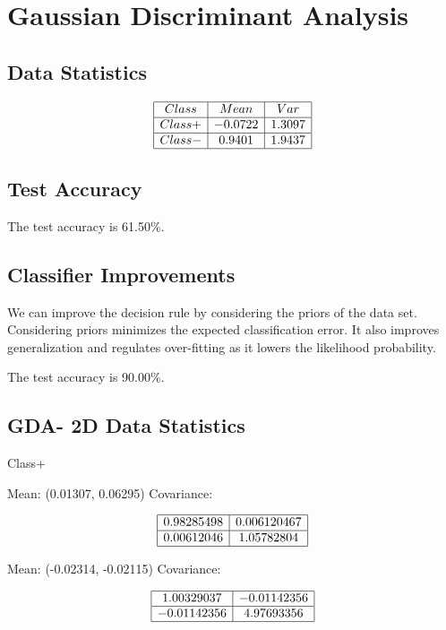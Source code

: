 \documentclass{article}
\begin{document}
\section{Gaussian Discriminant Analysis}
\subsection{Data Statistics}

\[
\begin{array}{|c|c|c|}
\hline
Class & Mean & Var \\
\hline
Class + & -0.0722 & 1.3097 \\
\hline
Class - & 0.9401 & 1.9437 \\
\hline
\end{array}
\]

\subsection{Test Accuracy}
The test accuracy is 61.50\%.

\subsection{Classifier Improvements}
We can improve the decision rule by considering the priors of the data set. Considering priors minimizes the expected classification error. It also improves generalization and regulates over-fitting as it lowers the likelihood probability.

The test accuracy is 90.00\%.

\subsection{GDA- 2D Data Statistics}

Class+ 

Mean: (0.01307, 0.06295) 
Covariance:

\[
\begin{array}{|c|c|}
\hline
 0.98285498 & 0.006120467 \\
\hline
 0.00612046 & 1.05782804 \\
\hline
\end{array}
\]

Mean: (-0.02314, -0.02115) 
Covariance:

\[
\begin{array}{|c|c|}
\hline
 1.00329037 & -0.01142356 \\
\hline
 -0.01142356 & 4.97693356 \\
\hline
\end{array}
\]
\end{document}
